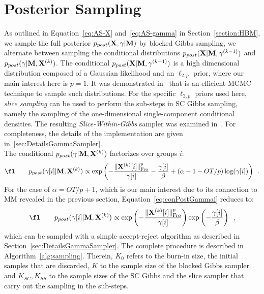 \section{Posterior Sampling}
\label{section:hbm_sampling}

As outlined in Equation~\eqref{eq:AS-X} and~\eqref{eq:AS-gamma} in Section~\ref{section:HBM}, we sample the full posterior $p_{post}(\mathbf{X},\gamma|\mathbf{M})$ by blocked Gibbs sampling, \ie we alternate between sampling the conditional distributions $p_{post}(\mathbf{X}|\mathbf{M},\mathbf{\gamma}^{(k-1)})$ and $p_{post}(\mathbf{\gamma}|\mathbf{M},\mathbf{X}^{(k)})$. The conditional $p_{post}(\mathbf{X}|\mathbf{M},\mathbf{\gamma}^{(k-1)})$ is a high dimensional distribution composed of a Gaussian likelihood and an $\ell_{2,p}$ prior, where our main interest here is $p = 1$. It was demonstrated in~\cite{Lu12} that  is an efficient MCMC technique to sample such distributions. For the specific $\ell_{2,p}$ priors used here, \emph{slice sampling} can be used to perform the sub-steps in SC Gibbs sampling, namely the sampling of the one-dimensional single-component conditional densities. The resulting \emph{Slice-Within-Gibbs} sampler was examined in~\cite{Lu16}. For completeness, the details of the implementation are given in~\ref{sec:DetailsGammaSampler}.\\

The conditional $p_{post}(\mathbf{\gamma}|\mathbf{M},\mathbf{X}^{(k)})$ factorizes over groups $i$:
\begin{equation}
\fl \qquad p_{post}(\mathbf{\gamma}[i]|\bfM,\bfX^{(k)}) \propto \exp \left( -\frac{\fronorm{\bfX^{(k)}[i]}^p}{\mathbf{\gamma}[i]} - \frac{\mathbf{\gamma}[i]}{\beta} + (\alpha - 1 - O T/p) \log(\mathbf{\gamma}[i]) \right) \enspace. \label{eq:conPostGammai}
\end{equation}
For the case of $\alpha = O T/p + 1$, which is our main interest due to its connection to MM revealed in the previous section, Equation~\eqref{eq:conPostGammai} reduces to:
\begin{equation}
\fl \qquad p_{post}(\mathbf{\gamma}[i] |\bfM, \bfX^{(k)}) \propto \exp \left(- \frac{\fronorm{\bfX^{(k)}[i]}^p}{\mathbf{\gamma}[i]} \right) \exp \left(- \frac{\mathbf{\gamma}[i]}{\beta} \right) \enspace, \label{eq:conPostGammaiRed}
\end{equation}
which can be sampled with a simple accept-reject algorithm as described in Section~\ref{sec:DetailsGammaSampler}. The complete procedure is described in Algorithm~\ref{alg:sampling}. Therein, $K_0$ refers to the burn-in size, \ie the initial samples that are discarded, $K$ to the sample size of the blocked Gibbs sampler and $K_{SC}, K_{SS}$ to the sample sizes of the SC Gibbs and the slice sampler that carry out the sampling in the sub-steps.

